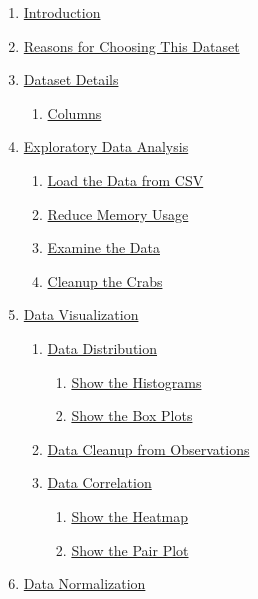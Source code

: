 \documentclass[11pt]{article}
\providecommand{\tightlist}{%
      \setlength{\itemsep}{0pt}\setlength{\parskip}{0pt}}
\begin{document}
\begin{enumerate}
\def\labelenumi{\arabic{enumi}.}
\tightlist
\item
  \hyperref[introduction]{Introduction}
\item
  \hyperref[reasons-for-choosing-this-dataset]{Reasons for Choosing This Dataset}
\item
  \hyperref[dataset-details]{Dataset Details}

  \begin{enumerate}
  \def\labelenumii{\arabic{enumii}.}
  \tightlist
  \item
    \hyperref[columns]{Columns}
  \end{enumerate}
\item
  \hyperref[exploratory-data-analysis]{Exploratory Data Analysis}

  \begin{enumerate}
  \def\labelenumii{\arabic{enumii}.}
  \tightlist
  \item
    \hyperref[load-the-data-from-csv]{Load the Data from CSV}
  \item
    \hyperref[reduce-memory-usage]{Reduce Memory Usage}
  \item
    \hyperref[examine-the-data]{Examine the Data}
  \item
    \hyperref[cleanup-the-crabs]{Cleanup the Crabs}
  \end{enumerate}
\item
  \hyperref[data-visualization]{Data Visualization}

  \begin{enumerate}
  \def\labelenumii{\arabic{enumii}.}
  \tightlist
  \item
    \hyperref[data-distribution]{Data Distribution}

    \begin{enumerate}
    \def\labelenumiii{\arabic{enumiii}.}
    \tightlist
    \item
      \hyperref[show-the-histograms]{Show the Histograms}
    \item
      \hyperref[show-the-box-plots]{Show the Box Plots}
    \end{enumerate}
  \item
    \hyperref[more-data-cleanup-from-observations]{Data Cleanup from Observations}
  \item
    \hyperref[data-correlation]{Data Correlation}

    \begin{enumerate}
    \def\labelenumiii{\arabic{enumiii}.}
    \tightlist
    \item
      \hyperref[show-the-heatmap]{Show the Heatmap}
    \item
      \hyperref[show-the-pair-plot]{Show the Pair Plot}
    \end{enumerate}
  \end{enumerate}
\item
  \hyperref[data-normalization]{Data Normalization}


\end{enumerate}
\end{document}
